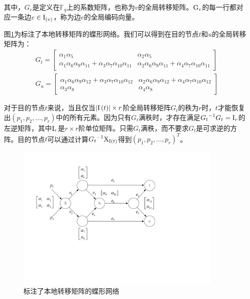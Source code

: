 其中，$G_{v}$是定义在$\mathbb{F}_{q}$上的系数矩阵，也称为$v$的全局转移矩阵。${\rm G}_{v}$的每一行都对应一条边$e \in {\rm I}_{\left( v \right)}$，称为边$e$的全局编码向量。
\par
图\ref{ZHUANYI_EPS}为标注了本地转移矩阵的蝶形网络。我们可以得到在目的节点$t$和$u$的全局转移矩阵为：
\begin{eqnarray}\label{eq23}
{G_t} = \left[ {\begin{array}{*{20}{c}}
	{{\alpha _1}{\alpha _5}}&{{\alpha _2}{\alpha _5}}\\
	{{\alpha _1}{\alpha _6}{\alpha _9}{\alpha _{11} }+{\alpha _3}{\alpha _7}{\alpha _{10}}{\alpha _{11} }}&{{\alpha _2}{\alpha _6}{\alpha _9}{\alpha _{11}}+{\alpha _4}{\alpha _7}{\alpha _{10}}{\alpha _{11}}}
	\end{array}} \right] \nonumber \\
{G_u}= \left[ {\begin{array}{*{20}{c}}
	{{\alpha _1}{\alpha _6}{\alpha _9}{\alpha _{12} }+{\alpha _3}{\alpha _7}{\alpha _{10}}{\alpha _{12} }}&{{\alpha _2}{\alpha _6}{\alpha _9}{\alpha _{12}}+{\alpha _4}{\alpha _7}{\alpha _{10}}{\alpha _{12}}}\\
	{{\alpha _3}{\alpha _8}}&{{\alpha _4}{\alpha _8}}
	\end{array}} \right]
\end{eqnarray}
\par
对于目的节点$t$来说，当且仅当$\left|{\rm I}\left(t\right)\right| \times r$阶全局转移矩阵$G_{t}$的秩为$r$时，$t$才能恢复出$\left(p_1,p_2,\dots,p_r\right)$中的所有元素。因为只有$G_t$满秩时，才存在满足${G_t}^{-1}G_t={\rm I}_r$的左逆矩阵，其中${\rm I}_r$是$r \times r$阶单位矩阵。只需$G_{t}$满秩，而不要求$G_{t}$是可求逆的方阵。目的节点$t$可以通过计算${G_t}^{-1}{\rm X}_{{\rm I}\left(t\right)}$得到$\left(p_1,p_2,\dots,p_r\right)^{T}$。
\begin{figure}[htbp]
	\centering
	\includegraphics[width=4in]{figures/zhuanyi.pdf}
	\caption{标注了本地转移矩阵的蝶形网络}
	\label{ZHUANYI_EPS}
\end{figure}
